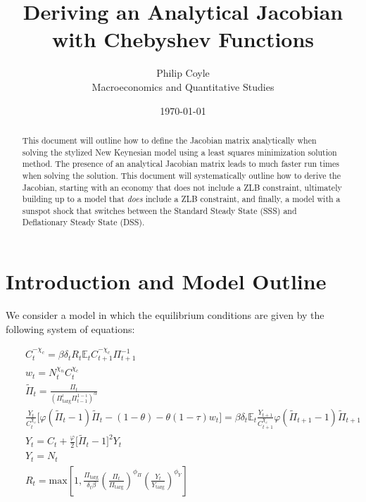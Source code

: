 \documentclass[11pt]{article}
\begin{document}
	
	\title{Deriving an Analytical Jacobian\\with Chebyshev Functions}
	\author{Philip Coyle\\Macroeconomics and Quantitative Studies}
	\date{\today}
	\maketitle
	
	
\begin{abstract}
	This document will outline how to define the Jacobian matrix analytically when solving the stylized New Keynesian model using a least squares minimization solution method. The presence of an analytical Jacobian matrix leads to much faster run times when solving the solution. This document will systematically outline how to derive the Jacobian, starting with an economy that does not include a ZLB constraint, ultimately building up to a model that \emph{does} include a ZLB constraint, and finally, a model with a sunspot shock that switches between the Standard Steady State (SSS) and Deflationary Steady State (DSS). 
\end{abstract}

\section{Introduction and Model Outline}

We consider a model in which the equilibrium conditions are given by the following system of equations: 

\begin{eqnarray}
& & C_{t}^{-\chi_{c}} = \beta\delta_tR_{t} \mathbb{E}_tC_{t+1}^{-\chi_{c}}\Pi_{t+1}^{-1}\label{eq:CEE}\\
& & w_t = N_t^{\chi_n}C_t^{\chi_c}\label{eq:IOC}\\
& & \tilde{\Pi}_t = \frac{\Pi_t}{\left(\Pi_{\text{targ}}^{\iota}\Pi_{t-1}^{1-\iota}\right)^{\alpha}}\label{eq:RIS}\\
& & \frac{Y_{t}}{C_{t}^{\chi_{c}}}\bigl[ \varphi (\tilde{\Pi}_t - 1)\tilde{\Pi}_t - (1 - \theta) - \theta (1-\tau)w_t\bigr] =  \beta\delta_t\mathbb{E}_t\frac{Y_{t+1}}{C_{t+1}^{\chi_{c}}}\varphi (\tilde{\Pi}_{t+1} - 1)\tilde{\Pi}_{t+1}\label{FPC}\\
& & Y_{t} = C_{t} + \frac{\varphi}{2}\bigl[ \tilde{\Pi}_{t} - 1 \bigr]^{2}Y_{t}\label{eq:ARC}\\
& & Y_t = N_t\\
& & R_{t} = \text{max} \left[1, \frac{\Pi_{\text{targ}}}{\delta_t\beta}\left(\frac{\Pi_{t}}{\Pi_{\text{targ}}}\right)^{\phi_{\Pi}}\left(\frac{Y_{t}}{Y_{\text{targ}}}\right)^{\phi_{Y}}\right] \label{TR}
\end{eqnarray}
\end{document}
